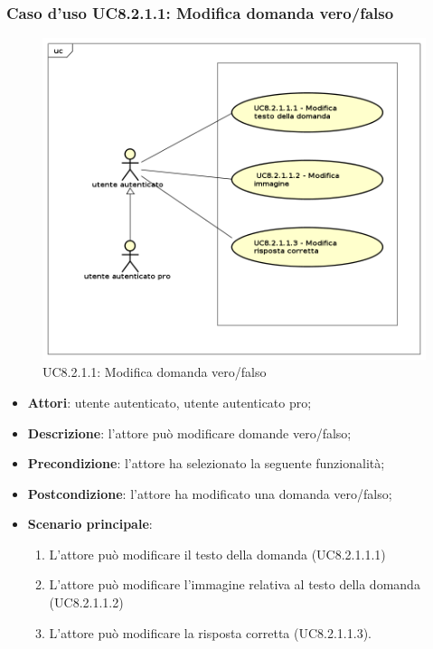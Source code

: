 \subsubsection{Caso d'uso UC8.2.1.1: Modifica domanda vero/falso}
	\label{UC8.2.1.1}
	\begin{figure}[h]
		\centering
			\includegraphics[scale=0.45,keepaspectratio]{UML/UC8_2_1_1.png}
		\caption{UC8.2.1.1: Modifica domanda vero/falso}
	\end{figure}
	\FloatBarrier
	\begin{itemize}
		\item
			\textbf{Attori}: utente autenticato, utente autenticato pro;
		\item		
			\textbf{Descrizione}: l'attore può modificare domande vero/falso;
		\item
			\textbf{Precondizione}: l'attore ha selezionato la seguente funzionalità; 
		\item
			\textbf{Postcondizione}: l'attore ha modificato una domanda vero/falso;
		\item
			\textbf{Scenario principale}:
	       		\begin{enumerate}
	       			\item
	       			L'attore può modificare il testo della domanda (UC8.2.1.1.1)
	       			\item
	       			L'attore può modificare l'immagine relativa al testo della domanda (UC8.2.1.1.2)
					\item
					L'attore può modificare la risposta corretta (UC8.2.1.1.3).
	 			\end{enumerate}
	\end{itemize}
	
